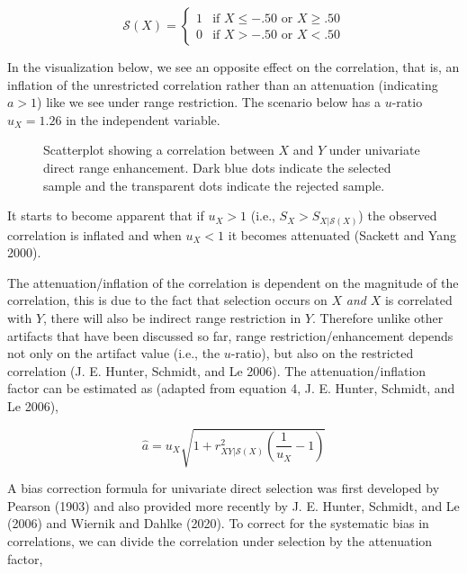 \documentclass[
  letterpaper,
  DIV=11,
  numbers=noendperiod]{scrreprt}
\begin{document}
\[
\mathcal{S}(X) = \begin{cases}1 & \text{if }X\leq-.50 \text{ or } X\geq.50\\0 & \text{if }X>-.50 \text{ or } X<.50\end{cases}
\]

In the visualization below, we see an opposite effect on the
correlation, that is, an inflation of the unrestricted correlation
rather than an attenuation (indicating \(a>1\)) like we see under range
restriction. The scenario below has a \(u\)-ratio \(u_X=1.26\) in the
independent variable.

\begin{figure}[H]


\caption{\label{fig-uvdre}Scatterplot showing a correlation between
\(X\) and \(Y\) under univariate direct range enhancement. Dark blue
dots indicate the selected sample and the transparent dots indicate the
rejected sample.}

\end{figure}%

It starts to become apparent that if \(u_X>1\) (i.e.,
\(S_X>S_{X|\mathcal{S}(X)}\)) the observed correlation is inflated and
when \(u_X<1\) it becomes attenuated (Sackett and Yang 2000).

The attenuation/inflation of the correlation is dependent on the
magnitude of the correlation, this is due to the fact that selection
occurs on \(X\) \emph{and} \(X\) is correlated with \(Y\), there will
also be indirect range restriction in \(Y\). Therefore unlike other
artifacts that have been discussed so far, range restriction/enhancement
depends not only on the artifact value (i.e., the \(u\)-ratio), but also
on the restricted correlation (J. E. Hunter, Schmidt, and Le 2006). The
attenuation/inflation factor can be estimated as (adapted from equation
4, J. E. Hunter, Schmidt, and Le 2006),

\[
\hat{a} = u_X \sqrt{1+r_{XY|\mathcal{S}(X)}^2\left(\frac{1}{u_X}-1\right)}
\]

A bias correction formula for univariate direct selection was first
developed by Pearson (1903) and also provided more recently by J. E.
Hunter, Schmidt, and Le (2006) and Wiernik and Dahlke (2020). To correct
for the systematic bias in correlations, we can divide the correlation
under selection by the attenuation factor,
\end{document}
